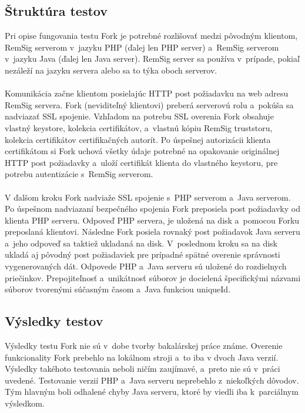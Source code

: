 \documentclass[
  digital, %
  table,   %
oneside,
  nolof,     %
  nolot,     %
]{fithesis3}
\begin{document}
\subsection{Štruktúra testov}
Pri opise fungovania testu Fork je potrebné rozlišovať medzi pôvodným klientom, RemSig serverom v~jazyku PHP (ďalej len PHP server) a~RemSig serverom v~jazyku Java (ďalej len Java server). RemSig server sa používa v~prípade, pokiaľ nezáleží na jazyku servera alebo sa to týka oboch serverov. \paragraph{} 
Komunikácia začne klientom posielajúc HTTP post požiadavku na web adresu RemSig servera. Fork (neviditeľný klientovi) preberá serverovú rolu a~pokúša sa nadviazať SSL spojenie. Vzhľadom na potrebu SSL overenia Fork  obsahuje vlastný keystore, kolekcia certifikátov, a~vlastnú kópiu RemSig truststoru, kolekcia certifikátov certifikačných autorít. Po úspešnej autorizácii klienta certifikátom si Fork uchová všetky údaje potrebné na opakovanie originálnej HTTP post požiadavky a~uloží certifikát klienta do vlastného keystoru, pre potrebu autentizácie s~RemSig serverom. \paragraph{}
V ďalšom kroku Fork nadviaže SSL spojenie s~PHP serverom a~Java serverom. Po úspešnom nadviazaní bezpečného spojenia Fork preposiela post požiadavky od klienta PHP serveru. Odpoveď PHP servera, je uložená na disk a~pomocou Forku preposlaná klientovi. Následne Fork posiela rovnaký post požiadavok Java serveru a~jeho odpoveď sa taktiež ukladaná na disk. V~poslednom kroku sa na disk ukladá aj pôvodný post požiadaviek pre prípadné spätné overenie správnosti vygenerovaných dát.
Odpovede PHP a~Java serveru sú uložené do rozdielnych priečinkov. Prepojiteľnosť a~unikátnosť  súborov je docielená špecifickými názvami súborov tvorenými súčasným časom a~Java funkciou  uniqueId. 
\subsection{Výsledky testov}
Výsledky testu Fork nie sú v~dobe tvorby bakalárskej práce známe. Overenie funkcionality Fork prebehlo na lokálnom stroji a~to iba v dvoch Java verzií. Výsledky takéhoto testovania neboli ničím zaujímavé, a~preto nie sú v~práci uvedené. Testovanie verzií PHP a~Java serveru neprebehlo z~niekoľkých dôvodov. Tým hlavným boli odhalené chyby Java serveru, ktoré by viedli iba k~parciálnym výsledkom.
\end{document}
